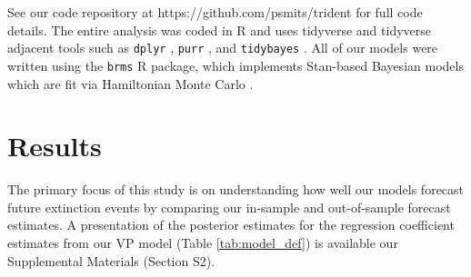 \documentclass[12pt,letterpaper]{article}
\begin{document}
\begin{refsection}

See our code repository at https://github.com/psmits/trident for full code details. The entire analysis was coded in R and uses tidyverse and tidyverse adjacent tools such as \texttt{dplyr} \citep{dplyr}, \texttt{purr} \citep{purrr}, and \texttt{tidybayes} \citep{tidybayes}. All of our models were written using the \texttt{brms} \citep{brms2017,brms2018} R package, which implements Stan-based Bayesian models which are fit via Hamiltonian Monte Carlo \citep{StanManual}.


\section{Results}

The primary focus of this study is on understanding how well our models forecast future extinction events by comparing our in-sample and out-of-sample forecast estimates. A presentation of the posterior estimates for the regression coefficient estimates from our VP model (Table \ref{tab:model_def}) is available our Supplemental Materials (Section S2).


\end{refsection}
\end{document}
